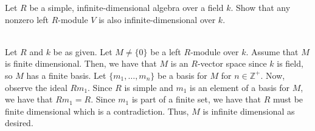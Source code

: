 Let $R$ be a simple, infinite-dimensional algebra over a field $k$. Show that any nonzero left
$R$-module $V$ is also infinite-dimensional over $k$.\\

\begin{solution}\renewcommand{\qedsymbol}{}\ \\
    Let $R$ and $k$ be as given. Let $M\neq\{0\}$ be a left $R$-module over $k$. Assume that $M$ is
    finite dimensional. Then, we have that $M$ is an $R$-vector space since $k$ is field, so $M$ has a
    finite basis. Let $\{m_1,\ldots,m_n\}$ be a basis for $M$ for $n\in\mathbb{Z}^+$. Now, observe the
    ideal $Rm_1$. Since $R$ is simple and $m_1$ is an element of a basis for $M$, we have that $Rm_1=R$.
    Since $m_1$ is part of a finite set, we have that $R$ must be finite dimensional which is a
    contradiction. Thus, $M$ is infinite dimensional as desired.

\end{solution}